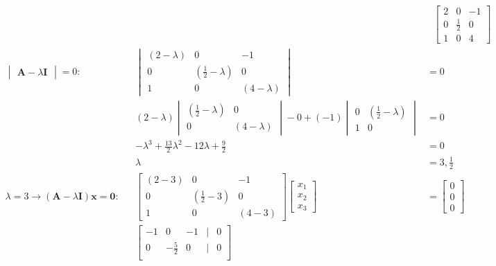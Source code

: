 \documentclass{article}
\begin{document}
\begin{align}
    \label{eq:1}
    && &\text{ } \begin{bmatrix} 
    2 & 0 & -1\\
    0 & \frac{1}{2} & 0\\
    1 & 0 & 4 \end{bmatrix}
    \\
    \label{eq:2}
    \begin{vmatrix}
    \textbf{A} - \lambda\textbf{I}
    \end{vmatrix} = 0: && \begin{vmatrix}
    (2-\lambda) & 0 & -1\\
    0 & (\frac{1}{2}-\lambda) & 0\\
    1 & 0 & (4-\lambda)
    \end{vmatrix}&= 0
    \\
    \label{eq:3}
    &&(2-\lambda)\begin{vmatrix}
    (\frac{1}{2}-\lambda) & 0\\
    0 & (4-\lambda)
    \end{vmatrix} - 0 + (-1)\begin{vmatrix}
    0 & (\frac{1}{2}-\lambda)\\
    1 & 0
    \end{vmatrix} &= 0
    \\
    \label{eq:4}
    && -\lambda^3+\frac{13}{2}\lambda^2-12\lambda+\frac{9}{2}&= 0
    \\
    \label{eq:5}
    && \lambda &= 3, \frac{1}{2}
    \\
    \label{eq:6}
    \lambda=3 \rightarrow (\textbf{A}-\lambda\textbf{I})\textbf{x}=\textbf{0}: && \begin{bmatrix}
    (2-3) & 0 & -1\\
    0 & (\frac{1}{2}-3) & 0\\
    1 & 0 & (4-3)
    \end{bmatrix}\begin{bmatrix} x_1\\x_2\\x_3 \end{bmatrix} &= \begin{bmatrix} 0\\0\\0 \end{bmatrix}
    \\
    \label{eq:7}
    && \begin{bmatrix}
    -1 & 0 & -1 &|& 0\\
    0 & -\frac{5}{2} & 0 &|& 0\\

\end{bmatrix}
\end{align}
\end{document}
